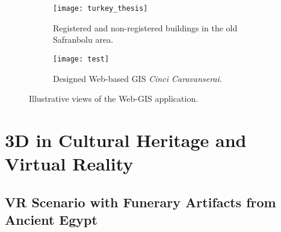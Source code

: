 

\begin{figure}
  \centering
  \begin{subfigure}[b]{0.45\textwidth}
      \centering
      \texttt{[image: turkey\_thesis]}
      \caption{Registered and non-registered buildings in the old Safranbolu area.}
      \label{fig:x}
  \end{subfigure}
  \hfill
  \begin{subfigure}[b]{0.45\textwidth}
      \centering
      \texttt{[image: test]}
      \caption{Designed Web-based \gls{GIS} \textit{Cinci Caravanserai}.}
      \label{fig:y}
  \end{subfigure}
     \caption{Illustrative views of the Web-\gls{GIS} application.}
     \label{fig:z}
\end{figure}









\section{\gls{3D} in Cultural Heritage and Virtual Reality}
\label{sec:3d_vr}

\subsection{\gls{VR} Scenario with Funerary Artifacts from Ancient Egypt} 
\label{sec:3d_vr_devices}

